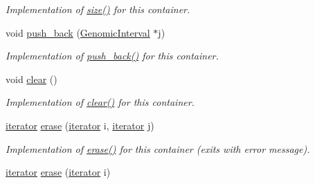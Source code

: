 \begin{CompactItemize}
\begin{CompactList}\small\item\em Implementation of \hyperlink{classGenomicIntervalSetAsArray_d4bfef55744241849841c71d08835403}{size()} for this container. \item\end{CompactList}\item 
\hypertarget{classGenomicIntervalSetAsArray_4348e7636cb91405b08374a966e33a7c}{
void \hyperlink{classGenomicIntervalSetAsArray_4348e7636cb91405b08374a966e33a7c}{push\_\-back} (\hyperlink{classGenomicInterval}{GenomicInterval} $\ast$j)}
\label{classGenomicIntervalSetAsArray_4348e7636cb91405b08374a966e33a7c}

\begin{CompactList}\small\item\em Implementation of \hyperlink{classGenomicIntervalSetAsArray_4348e7636cb91405b08374a966e33a7c}{push\_\-back()} for this container. \item\end{CompactList}\item 
\hypertarget{classGenomicIntervalSetAsArray_833395eaf9daa5626879eefa861d9ea5}{
void \hyperlink{classGenomicIntervalSetAsArray_833395eaf9daa5626879eefa861d9ea5}{clear} ()}
\label{classGenomicIntervalSetAsArray_833395eaf9daa5626879eefa861d9ea5}

\begin{CompactList}\small\item\em Implementation of \hyperlink{classGenomicIntervalSetAsArray_833395eaf9daa5626879eefa861d9ea5}{clear()} for this container. \item\end{CompactList}\item 
\hypertarget{classGenomicIntervalSetAsArray_0f8554cfca150d695d15691aa42df7fa}{
\hyperlink{classGenomicInterval}{iterator} \hyperlink{classGenomicIntervalSetAsArray_0f8554cfca150d695d15691aa42df7fa}{erase} (\hyperlink{classGenomicInterval}{iterator} i, \hyperlink{classGenomicInterval}{iterator} j)}
\label{classGenomicIntervalSetAsArray_0f8554cfca150d695d15691aa42df7fa}

\begin{CompactList}\small\item\em Implementation of \hyperlink{classGenomicIntervalSetAsArray_0f8554cfca150d695d15691aa42df7fa}{erase()} for this container (exits with error message). \item\end{CompactList}\item 
\hypertarget{classGenomicIntervalSetAsArray_0aae25ac2e9a7cf50a370703aa99df85}{
\hyperlink{classGenomicInterval}{iterator} \hyperlink{classGenomicIntervalSetAsArray_0aae25ac2e9a7cf50a370703aa99df85}{erase} (\hyperlink{classGenomicInterval}{iterator} i)}
\label{classGenomicIntervalSetAsArray_0aae25ac2e9a7cf50a370703aa99df85}


\end{CompactItemize}
